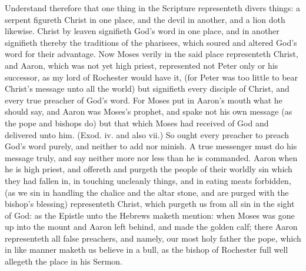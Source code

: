 Understand therefore that one thing in the Scripture representeth
divers things: a serpent figureth Christ in one 
place, and the devil in another, and a lion doth likewise. 
Christ by leaven signifieth God's word in one place, and in 
another signifieth thereby the traditions of the pharisees, 
which soured and altered God's word for their advantage. 
Now Moses verily in the said place representeth Christ, 
and Aaron, which was not yet high priest, represented not
Peter only or his successor, as my lord of Rochester would 
have it, (for Peter was too little to bear Christ's message 
unto all the world) but signifieth every disciple of Christ, and 
every true preacher of God's word. For Moses put in 
Aaron's mouth what he should say, and Aaron was Moses's
prophet, and spake not his own message (as the pope 
and bishops do) but that which Moses had received of God 
and delivered unto him. (Exod. iv. and also vii.) So ought 
every preacher to preach God's word purely, and neither 
to add nor minish. A true messenger must do his message 
truly, and say neither more nor less than he is commanded. 
Aaron when he is high priest, and offereth and purgeth the 
people of their worldly sin which they had fallen in, in 
touching uncleanly things, and in eating meats forbidden, 
(as we sin in handling the chalice and the altar stone, and 
are purged with the bishop's blessing) representeth Christ, 
which purgeth us from all sin in the sight of God: as the 
Epistle unto the Hebrews maketh mention: when Moses 
was gone up into the mount and Aaron left behind, and 
made the golden calf; there Aaron representeth all false 
preachers, and namely, our most holy father the pope, 
which in like manner maketh us believe in a bull, as the 
bishop of Rochester full well allegeth the place in his 
Sermon. 

